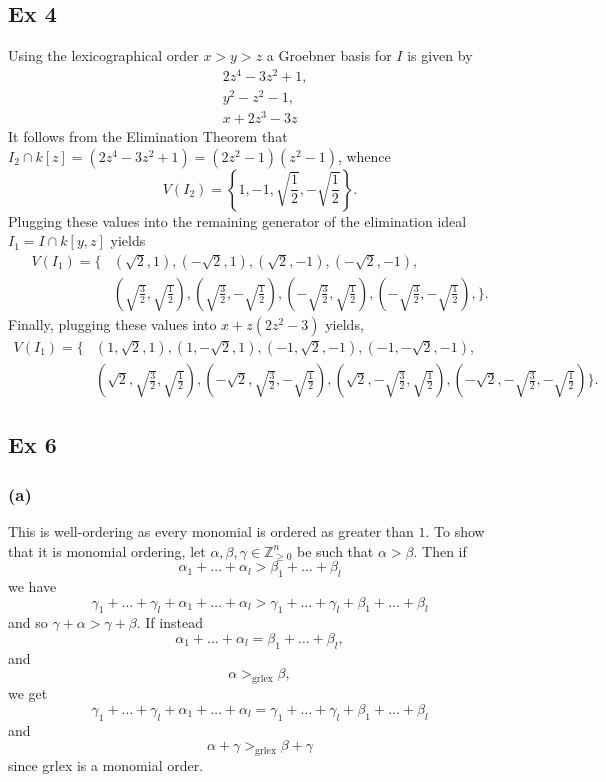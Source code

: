 \documentclass{article}
\theoremstyle{definition}
\newcommand{\Z}{\mathbb{Z}}
\begin{document}
\subsection*{Ex 4}

Using the lexicographical order $x > y > z$ a Groebner basis for $I$ is given by
\begin{align*}
	& 2z^{4}-3z^{2}+1, \\
	& y^{2}-z^{2}-1, \\
	& x+2z^{3}-3z
\end{align*} 
It follows from the Elimination Theorem that $I_2 \cap k[z] = (2z^4 - 3z^2 + 1) =
(2z^2 - 1)(z^2 - 1)$, whence
\[
	V(I_2) = \left\{
		1,
		-1,
		\sqrt{\frac{1}{2}},
		-\sqrt{\frac{1}{2}}
	\right\}.
\]
Plugging these values into the remaining generator of the elimination ideal
$I_1 = I \cap k[y, z]$ yields
\begin{align*}
	V(I_1) = \Bigg\{
	  & \left(\sqrt{2}, 1\right),
		\left(-\sqrt{2}, 1\right),
		\left(\sqrt{2}, -1\right),
		\left(-\sqrt{2}, -1\right), \\
	  & \left(\sqrt{\frac{3}{2}}, \sqrt{\frac{1}{2}}\right),
		\left(\sqrt{\frac{3}{2}}, -\sqrt{\frac{1}{2}}\right),
		\left(-\sqrt{\frac{3}{2}}, \sqrt{\frac{1}{2}}\right),
		\left(-\sqrt{\frac{3}{2}}, -\sqrt{\frac{1}{2}}\right),
		\Bigg\}.
\end{align*} 
Finally, plugging these values into $x+z(2z^2 - 3)$ yields,
\begin{align*}
	V(I_1) = \Bigg\{
	& \left(1, \sqrt{2}, 1\right),
	 \left(1, -\sqrt{2}, 1\right), 
	 \left(-1, \sqrt{2}, -1\right),
	 \left(-1, -\sqrt{2}, -1\right), \\
	& \left(\sqrt{2}, \sqrt{\frac{3}{2}}, \sqrt{\frac{1}{2}}\right),
	 \left(-\sqrt{2}, \sqrt{\frac{3}{2}}, -\sqrt{\frac{1}{2}}\right),
	 \left(\sqrt{2}, -\sqrt{\frac{3}{2}}, \sqrt{\frac{1}{2}}\right),
	 \left(-\sqrt{2}, -\sqrt{\frac{3}{2}}, -\sqrt{\frac{1}{2}}\right)
	\Bigg\}.
\end{align*} 

\subsection*{Ex 6}
\subsubsection*{(a)}

This is well-ordering as every monomial is ordered as greater than $1$. To show
that it is monomial ordering, let $\alpha, \beta, \gamma \in \Z_{\geq 0}^{n}$
be such that $\alpha > \beta$. Then if
\[
	\alpha_1 + \ldots + \alpha_l
	>
	\beta_1 + \ldots + \beta_l
\]
we have 
\[
	\gamma_1 + \ldots + \gamma_l
	+
	\alpha_1 + \ldots + \alpha_l
	>
	\gamma_1 + \ldots + \gamma_l
	+
	\beta_1 + \ldots + \beta_l
\]
and so $\gamma + \alpha > \gamma + \beta$. If instead 
\[
	\alpha_1 + \ldots + \alpha_l
	=
	\beta_1 + \ldots + \beta_l,
\]
and
\[
	\alpha >_{\text{grlex}} \beta,
\] 
we get
\[
	\gamma_1 + \ldots + \gamma_l
	+
	\alpha_1 + \ldots + \alpha_l
	=
	\gamma_1 + \ldots + \gamma_l
	+
	\beta_1 + \ldots + \beta_l
\]
and 
\[
	\alpha + \gamma >_{\text{grlex}} \beta + \gamma
\] 
since grlex is a monomial order.
\end{document}
